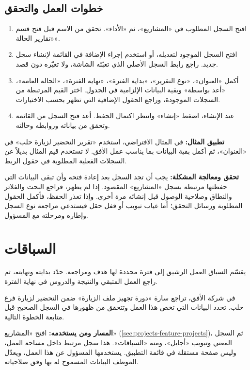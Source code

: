 \subsection{خطوات العمل والتحقق}
\begin{enumerate}
\item افتح السجل المطلوب في «المشاريع»، ثم «الأداء». تحقق من الاسم قبل فتح قسم «تقارير الحالة».
\item افتح السجل الموجود لتعديله، أو استخدم إجراء الإضافة في القائمة لإنشاء سجل جديد. راجع رابط السجل الأصلي الذي تعبّئه الشاشة، ولا تغيّره دون قصد.
\item أكمل «العنوان»، «نوع التقرير»، «بداية الفترة»، «نهاية الفترة»، «الحالة العامة»، «أعد بواسطة» وبقية البيانات الإلزامية في الجدول. اختر القيم المرتبطة من السجلات الموجودة، وراجع الحقول الإضافية التي تظهر بحسب الاختيارات.
\item عند الإنشاء، اضغط «إنشاء» وانتظر اكتمال الحفظ. أعد فتح السجل من القائمة وتحقق من بياناته وروابطه وحالته.
\end{enumerate}

\textbf{تطبيق المثال:} في المثال الافتراضي، استخدم «تقرير التحضير لزيارة حلب» في «العنوان»، ثم أكمل بقية البيانات بما يناسب عمل الأفق. لا تستخدم قيم المثال بديلاً عن السجلات الفعلية المطلوبة في حقول الربط.

\textbf{تحقق ومعالجة المشكلة:} يجب أن تجد السجل بعد إعادة فتحه وأن تبقى البيانات التي حفظتها مرتبطة بسجل «المشاريع» المقصود. إذا لم يظهر، فراجع البحث والفلاتر والنطاق وصلاحية الوصول قبل إنشائه مرة أخرى. وإذا تعذر الحفظ، فأكمل الحقول المطلوبة ورسائل التحقق؛ أما غياب تبويب أو قفل حقل فيستدعي مراجعة نوع السجل وإطاره ومرحلته مع المسؤول.

\clearpage
\section{السباقات}
\label{sec:projects-feature-sprints}

يقسّم السباق العمل الرشيق إلى فترة محددة لها هدف ومراجعة. حدّد بدايته ونهايته، ثم راجع العمل المتبقي والنتيجة والدروس في نهاية الفترة.

\begin{rcnote}
في شركة الأفق، تراجع سارة «دورة تجهيز ملف الزيارة» ضمن التحضير لزيارة فرع حلب. تحدد البيانات التي تخص هذا العمل وتتحقق من ظهورها في السجل الصحيح قبل متابعة الخطوة التالية.
\end{rcnote}

\textbf{المسار ومن يستخدمه:} افتح «المشاريع» (\ref{sec:projects-feature-projects})، ثم السجل المعني وتبويب «أجايل»، ومنه «السباقات». هذا سجل مرتبط داخل مساحة العمل، وليس صفحة مستقلة في قائمة التطبيق. يستخدمها المسؤول عن هذا العمل، ويعدّل الموظف البيانات المسموح له بها وفق صلاحياته.


